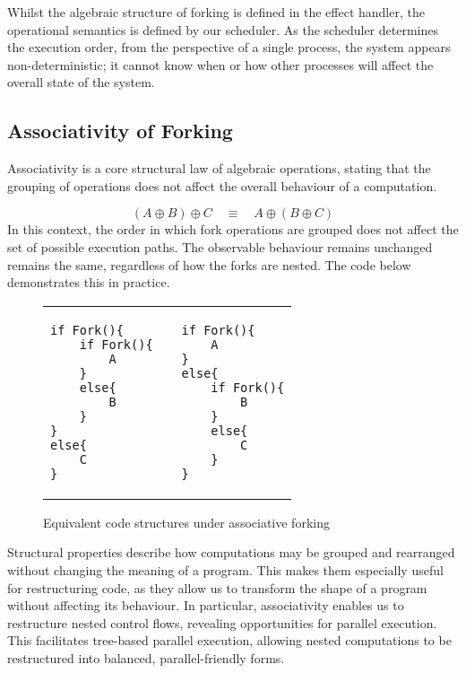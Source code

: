 \documentclass[logo,bsc,singlespacing,parskip]{infthesis}
\begin{document}
Whilst the algebraic structure of forking is defined in the effect handler, the operational semantics is defined by our scheduler. As the scheduler determines the execution order, from the perspective of a single process, the system appears non-deterministic; it cannot know when or how other processes will affect the overall state of the system.

\subsection*{Associativity of Forking}
Associativity is a core structural law of algebraic operations, stating that the grouping of operations does not affect the overall behaviour of a computation.

\[
(A \oplus B) \oplus C \quad \equiv \quad A \oplus (B \oplus C)
\]
In this context, the order in which fork operations are grouped does not affect the set of possible execution paths. The observable behaviour remains unchanged remains the same, regardless of how the forks are nested. The code below demonstrates this in practice.


\begin{figure}[H]
    \centering


\begin{table}[H]
\centering
\begin{tabular}{p{} c p{}}
\begin{lstlisting}
if Fork(){
    if Fork(){
        A
    }
    else{
        B
    }
}
else{
    C
}
\end{lstlisting}
&
&
\begin{lstlisting}
if Fork(){
    A
} 
else{
    if Fork(){
        B
    }
    else{
        C
    }
}
\end{lstlisting}
\end{tabular}
\end{table}
\vspace{-2em}

    \caption{Equivalent code structures under associative forking}
    \label{fig:enter-label}
\end{figure}




Structural properties describe how computations may be grouped and rearranged without changing the meaning of a program. This makes them especially useful for restructuring code, as they allow us to transform the shape of a program without affecting its behaviour. In particular, associativity enables us to restructure nested control flows, revealing opportunities for parallel execution. This facilitates tree-based parallel execution, allowing nested computations to be restructured into balanced, parallel-friendly forms.
\end{document}
